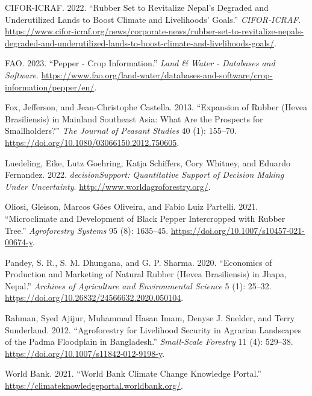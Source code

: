 \documentclass[
]{article}
\newlength{\cslhangindent}
\newlength{\cslentryspacingunit} %
\newenvironment{CSLReferences}[2] %
 {%
  \setlength{\parindent}{0pt}
  \ifodd #1
  \let\oldpar\par
  \def\par{\hangindent=\cslhangindent\oldpar}
  \fi
  \setlength{\parskip}{#2\cslentryspacingunit}
 }%
 {}
\begin{document}
\hypertarget{refs}{}
\begin{CSLReferences}{1}{0}
\leavevmode{}%
CIFOR-ICRAF. 2022. {``Rubber Set to Revitalize {Nepal}'s Degraded and Underutilized Lands to Boost Climate and Livelihoods' Goals.''} \emph{CIFOR-ICRAF}. \url{https://www.cifor-icraf.org/news/corporate-news/rubber-set-to-revitalize-nepals-degraded-and-underutilized-lands-to-boost-climate-and-livelihoods-goals/}.

\leavevmode{}%
FAO. 2023. {``Pepper - {Crop} Information.''} \emph{Land \& Water - Databases and Software}. \url{https://www.fao.org/land-water/databases-and-software/crop-information/pepper/en/}.

\leavevmode{}%
Fox, Jefferson, and Jean-Christophe Castella. 2013. {``Expansion of Rubber ({Hevea} Brasiliensis) in {Mainland} {Southeast} {Asia}: What Are the Prospects for Smallholders?''} \emph{The Journal of Peasant Studies} 40 (1): 155--70. \url{https://doi.org/10.1080/03066150.2012.750605}.

\leavevmode{}%
Luedeling, Eike, Lutz Goehring, Katja Schiffers, Cory Whitney, and Eduardo Fernandez. 2022. \emph{decisionSupport: Quantitative Support of Decision Making Under Uncertainty}. \url{http://www.worldagroforestry.org/}.

\leavevmode{}%
Oliosi, Gleison, Marcos Góes Oliveira, and Fabio Luiz Partelli. 2021. {``Microclimate and Development of Black Pepper Intercropped with Rubber Tree.''} \emph{Agroforestry Systems} 95 (8): 1635--45. \url{https://doi.org/10.1007/s10457-021-00674-y}.

\leavevmode{}%
Pandey, S. R., S. M. Dhungana, and G. P. Sharma. 2020. {``Economics of Production and Marketing of Natural Rubber ({Hevea} Brasiliensis) in {Jhapa}, {Nepal}.''} \emph{Archives of Agriculture and Environmental Science} 5 (1): 25--32. \url{https://doi.org/10.26832/24566632.2020.050104}.

\leavevmode{}%
Rahman, Syed Ajijur, Muhammad Hasan Imam, Denyse J. Snelder, and Terry Sunderland. 2012. {``Agroforestry for {Livelihood} {Security} in {Agrarian} {Landscapes} of the {Padma} {Floodplain} in {Bangladesh}.''} \emph{Small-Scale Forestry} 11 (4): 529--38. \url{https://doi.org/10.1007/s11842-012-9198-y}.

\leavevmode{}%
World Bank. 2021. {``World {Bank} {Climate} {Change} {Knowledge} {Portal}.''} \url{https://climateknowledgeportal.worldbank.org/}.

\end{CSLReferences}
\end{document}
